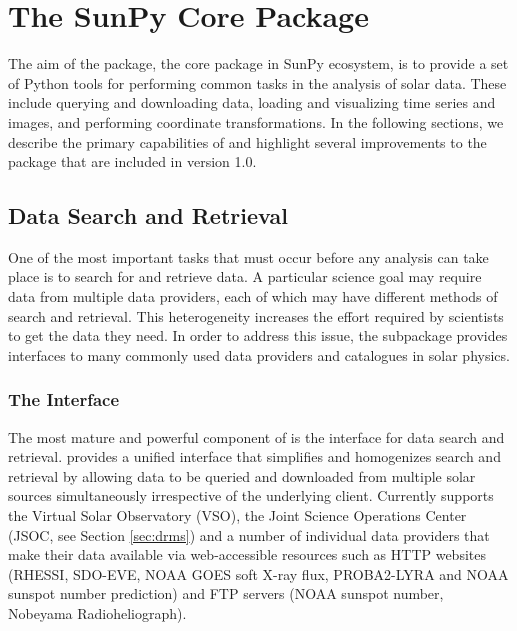 \section{The SunPy Core Package}
\label{sec:sunpycore}

The aim of the \sunpypkg package, the core package in SunPy ecosystem, is to provide a set of Python tools for performing common tasks in the analysis of solar data. These include querying and downloading data, loading and visualizing time series and images, and performing coordinate transformations. In the following sections, we describe the primary capabilities of \sunpypkg and highlight several improvements to the package that are included in version 1.0. 

\subsection{Data Search and Retrieval}
\label{sec:fido}

One of the most important tasks that must occur before any analysis can take place is to search for and retrieve data.
A particular science goal may require data from multiple data providers, each of which may have different methods of search and retrieval.
This heterogeneity increases the effort required by scientists to get the data they need.
In order to address this issue, the  subpackage provides interfaces to many commonly used data providers and catalogues in solar physics. 

\subsubsection{The \Fido Interface}
\label{sec:fido}

The most mature and powerful component of  is the \Fido interface for data search and retrieval.
\Fido provides a unified interface that simplifies and homogenizes search and retrieval by allowing data to be queried and downloaded from multiple solar sources simultaneously irrespective of the underlying client.
Currently \Fido supports the Virtual Solar Observatory (VSO), the Joint Science Operations Center (JSOC, see Section \ref{sec:drms}) and a number of individual data providers that make their data available via web-accessible resources such as HTTP websites (RHESSI, SDO-EVE, NOAA GOES soft X-ray flux, PROBA2-LYRA and NOAA sunspot number prediction) and FTP servers (NOAA sunspot number, Nobeyama Radioheliograph).

